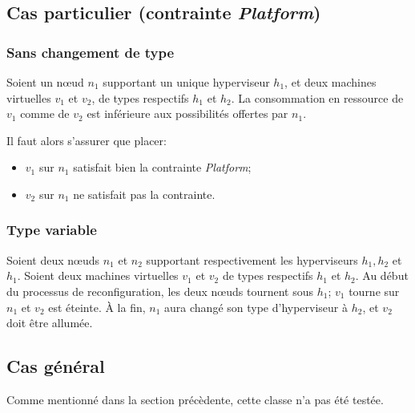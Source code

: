 \documentclass[a4paper]{article}
\begin{document}
\subsection{Cas particulier (contrainte \textit{Platform})}
\subsubsection{Sans changement de type}
Soient un nœud $n_1$ supportant un unique hyperviseur $h_1$, et deux
machines virtuelles $v_1$ et $v_2$, de types respectifs $h_1$ et $h_2$.
La consommation en ressource de $v_1$ comme de $v_2$ est inférieure aux
possibilités offertes par $n_1$.

Il faut alors s'assurer que placer:
\begin{itemize}
	\item $v_1$ sur $n_1$ satisfait bien la contrainte \textit{Platform};
	\item $v_2$ sur $n_1$ ne satisfait pas la contrainte.
\end{itemize}
\subsubsection{Type variable}
Soient deux nœuds $n_1$ et $n_2$ supportant respectivement les hyperviseurs
$h_1, h_2$ et $h_1$. Soient deux machines virtuelles $v_1$ et $v_2$ de
types respectifs $h_1$ et $h_2$. Au début du processus de reconfiguration,
les deux nœuds tournent sous $h_1$; $v_1$ tourne sur $n_1$ et $v_2$ est
éteinte. À la fin, $n_1$ aura changé son type d'hyperviseur à $h_2$, et
$v_2$ doit être allumée.

\subsection{Cas général}
Comme mentionné dans la section précèdente, cette classe n'a pas été testée.
\newpage
{}


\end{document}
